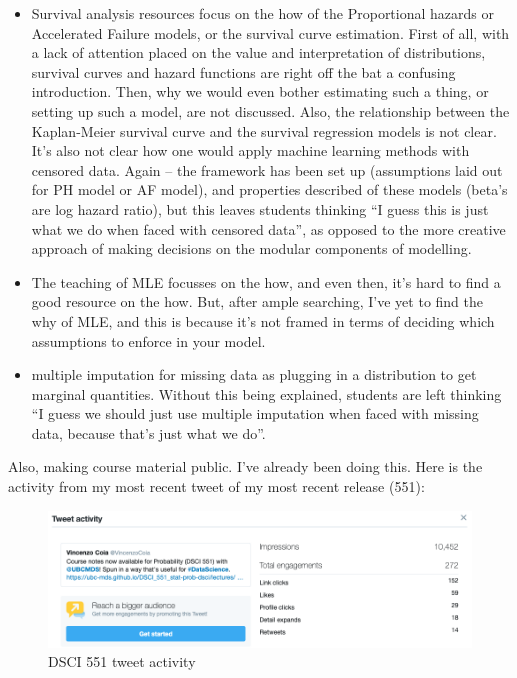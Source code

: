 \documentclass[]{article}
\providecommand{\tightlist}{%
  \setlength{\itemsep}{0pt}\setlength{\parskip}{0pt}}
\begin{document}
\begin{itemize}
\tightlist
\item
  Survival analysis resources focus on the how of the Proportional hazards or Accelerated Failure models, or the survival curve estimation. First of all, with a lack of attention placed on the value and interpretation of distributions, survival curves and hazard functions are right off the bat a confusing introduction. Then, why we would even bother estimating such a thing, or setting up such a model, are not discussed. Also, the relationship between the Kaplan-Meier survival curve and the survival regression models is not clear. It's also not clear how one would apply machine learning methods with censored data. Again -- the framework has been set up (assumptions laid out for PH model or AF model), and properties described of these models (beta's are log hazard ratio), but this leaves students thinking ``I guess this is just what we do when faced with censored data'', as opposed to the more creative approach of making decisions on the modular components of modelling.
\item
  The teaching of MLE focusses on the how, and even then, it's hard to find a good resource on the how. But, after ample searching, I've yet to find the why of MLE, and this is because it's not framed in terms of deciding which assumptions to enforce in your model.
\item
  multiple imputation for missing data as plugging in a distribution to get marginal quantities. Without this being explained, students are left thinking ``I guess we should just use multiple imputation when faced with missing data, because that's just what we do''.
\end{itemize}

Also, making course material public. I've already been doing this. Here is the activity from my most recent tweet of my most recent release (551):

\begin{figure}
\centering
\includegraphics{./img/551_tweet.png}
\caption{DSCI 551 tweet activity}
\end{figure}
\end{document}
